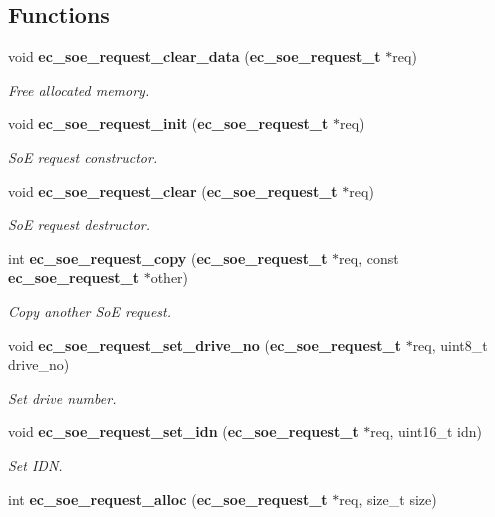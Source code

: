 \subsection*{\-Functions}
\begin{DoxyCompactItemize}
\item 
void {\bf ec\-\_\-soe\-\_\-request\-\_\-clear\-\_\-data} ({\bf ec\-\_\-soe\-\_\-request\-\_\-t} $\ast$req)
\begin{DoxyCompactList}\small\item\em \-Free allocated memory. \end{DoxyCompactList}\item 
void {\bf ec\-\_\-soe\-\_\-request\-\_\-init} ({\bf ec\-\_\-soe\-\_\-request\-\_\-t} $\ast$req)
\begin{DoxyCompactList}\small\item\em \-So\-E request constructor. \end{DoxyCompactList}\item 
void {\bf ec\-\_\-soe\-\_\-request\-\_\-clear} ({\bf ec\-\_\-soe\-\_\-request\-\_\-t} $\ast$req)
\begin{DoxyCompactList}\small\item\em \-So\-E request destructor. \end{DoxyCompactList}\item 
int {\bf ec\-\_\-soe\-\_\-request\-\_\-copy} ({\bf ec\-\_\-soe\-\_\-request\-\_\-t} $\ast$req, const {\bf ec\-\_\-soe\-\_\-request\-\_\-t} $\ast$other)
\begin{DoxyCompactList}\small\item\em \-Copy another \-So\-E request. \end{DoxyCompactList}\item 
void {\bf ec\-\_\-soe\-\_\-request\-\_\-set\-\_\-drive\-\_\-no} ({\bf ec\-\_\-soe\-\_\-request\-\_\-t} $\ast$req, uint8\-\_\-t drive\-\_\-no)
\begin{DoxyCompactList}\small\item\em \-Set drive number. \end{DoxyCompactList}\item 
void {\bf ec\-\_\-soe\-\_\-request\-\_\-set\-\_\-idn} ({\bf ec\-\_\-soe\-\_\-request\-\_\-t} $\ast$req, uint16\-\_\-t idn)
\begin{DoxyCompactList}\small\item\em \-Set \-I\-D\-N. \end{DoxyCompactList}\item 
int {\bf ec\-\_\-soe\-\_\-request\-\_\-alloc} ({\bf ec\-\_\-soe\-\_\-request\-\_\-t} $\ast$req, size\-\_\-t size)

\end{DoxyCompactItemize}

